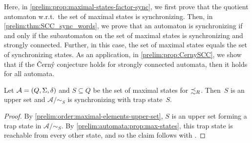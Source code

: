 
Here, %
in \cref{prelim:prop:maximal-states-factor-sync},
we first prove that the quotient automaton w.r.t.~the set of maximal
states is synchronizing.
Then, in \cref{prelim:thm:SCC_sync_words}, we prove that an automaton is synchronizing if and only if the subautomaton
on the set of maximal states is synchronizing and strongly connected.
Further, in this case, the set of maximal states equals the set of synchronizing states.
As an application, in \cref{prelim:prop:CernySCC},
we show that if the \v{C}ern\'y conjecture holds for strongly connected automata,
then it holds for all automata.

\begin{proposition}
	\label{prelim:prop:maximal-states-factor-sync}
	Let $\mathcal A = (Q, \Sigma, \delta)$ and $S \subseteq Q$ be
	the set of maximal states for $\precsim_R$.
	Then~$S$ is an upper set and $\mathcal A / {\sim_S}$ is synchronizing with trap state~$S$.
\end{proposition}
\begin{proof}
   By \cref{prelim:order:maximal-elements-upper-set}, $S$ is an upper set forming a trap state in $\mathcal A / {\sim_S}$. 
   By \cref{prelim:automata:prop:max-states}, this trap state is reachable from every other 
   state, and so the claim follows with
   .
\end{proof}

